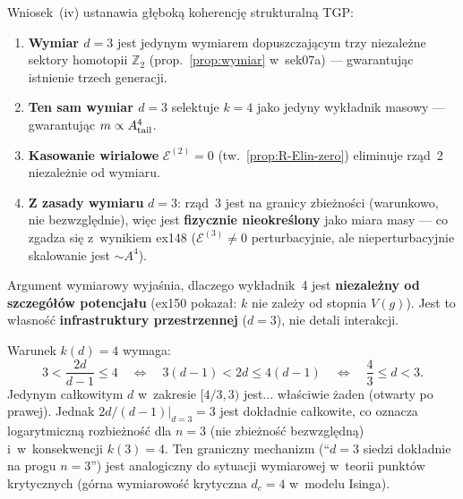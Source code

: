 \begin{remark}[Po\l{}\k{a}czenie z~prop:wymiar ($d = 3$)]%
\label{rem:R-dim3-connection}
Wniosek~(iv) ustanawia g\l{}\k{e}bok\k{a} koherencj\k{e}
strukturaln\k{a} TGP:
\begin{enumerate}[nosep]
  \item \textbf{Wymiar $d = 3$} jest jedynym wymiarem dopuszczaj\k{a}cym
    trzy niezale\.zne sektory homotopii $\mathbb{Z}_2$
    (prop.~\ref{prop:wymiar} w~sek07a) --- gwarantuj\k{a}c
    istnienie trzech generacji.
  \item \textbf{Ten sam wymiar $d = 3$} selektuje $k = 4$ jako
    jedyny wyk\l{}adnik masowy --- gwarantuj\k{a}c
    $m \propto A_{\rm tail}^4$.
  \item \textbf{Kasowanie wirialowe} $\mathcal{E}^{(2)} = 0$
    (tw.~\ref{prop:R-Elin-zero}) eliminuje rz\k{a}d~2
    niezale\.znie od wymiaru.
  \item \textbf{Z zasady wymiaru} $d = 3$: rz\k{a}d~3 jest
    na granicy zbie\.zno\'sci (warunkowo, nie bezwzgl\k{e}dnie),
    wi\k{e}c jest \textbf{fizycznie nieokreślony} jako miara
    masy --- co zgadza si\k{e} z~wynikiem ex148
    ($\mathcal{E}^{(3)} \neq 0$ perturbacyjnie, ale
    nieperturbacyjnie skalowanie jest $\sim A^4$).
\end{enumerate}
Argument wymiarowy wyja\'snia, dlaczego wyk\l{}adnik~4 jest
\textbf{niezale\.zny od szczeg\'o\l{}\'ow potencja\l{}u}
(ex150 pokaza\l{}: $k$ nie zale\.zy od stopnia $V(g)$).
Jest to w\l{}asno\'s\'c \textbf{infrastruktury przestrzennej}
($d = 3$), nie detali interakcji.
\end{remark}

\begin{remark}[R\'ownowa\.zna forma: dlaczego $d = 3$ jest
  jedynym wymiarem z~$k = 4$]%
\label{rem:R-k4-unique}
Warunek $k(d) = 4$ wymaga:
\[
  3 < \frac{2d}{d-1} \leq 4
  \quad\Longleftrightarrow\quad
  3(d-1) < 2d \leq 4(d-1)
  \quad\Longleftrightarrow\quad
  \frac{4}{3} \leq d < 3.
\]
Jedynym ca\l{}kowitym $d$ w~zakresie $[4/3, 3)$ jest...
w\l{}a\'sciwie \.zaden (otwarty po prawej). Jednak
$2d/(d-1)\big|_{d=3} = 3$ jest dok\l{}adnie ca\l{}kowite,
co oznacza logarytmiczn\k{a} rozbie\.zno\'s\'c dla $n = 3$
(nie zbie\.zno\'s\'c bezwzgl\k{e}dn\k{a}) i~w~konsekwencji
$k(3) = 4$. Ten graniczny mechanizm (``$d = 3$ siedzi
dok\l{}adnie na progu $n = 3$'') jest analogiczny do
sytuacji wymiarowej w~teorii punkt\'ow krytycznych
(g\'orna wymiarowo\'s\'c krytyczna $d_c = 4$ w~modelu Isinga).
\end{remark}

